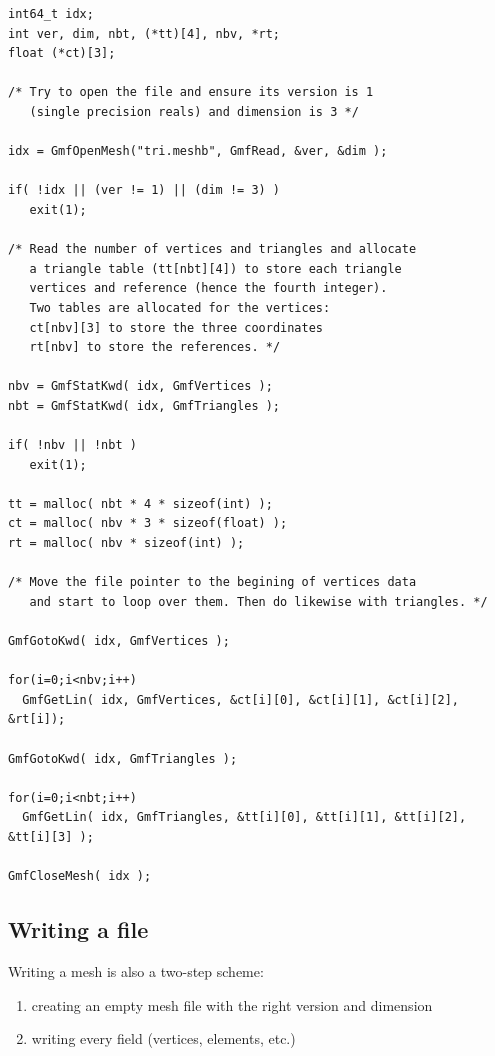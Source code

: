 \documentclass[a4paper,12pt]{article}
\begin{document}
\begin{tt}
\begin{verbatim}
int64_t idx;
int ver, dim, nbt, (*tt)[4], nbv, *rt;
float (*ct)[3];

/* Try to open the file and ensure its version is 1
   (single precision reals) and dimension is 3 */

idx = GmfOpenMesh("tri.meshb", GmfRead, &ver, &dim );

if( !idx || (ver != 1) || (dim != 3) )
   exit(1);

/* Read the number of vertices and triangles and allocate
   a triangle table (tt[nbt][4]) to store each triangle
   vertices and reference (hence the fourth integer).
   Two tables are allocated for the vertices:
   ct[nbv][3] to store the three coordinates
   rt[nbv] to store the references. */

nbv = GmfStatKwd( idx, GmfVertices );
nbt = GmfStatKwd( idx, GmfTriangles );

if( !nbv || !nbt )
   exit(1);

tt = malloc( nbt * 4 * sizeof(int) );
ct = malloc( nbv * 3 * sizeof(float) );
rt = malloc( nbv * sizeof(int) );

/* Move the file pointer to the begining of vertices data
   and start to loop over them. Then do likewise with triangles. */

GmfGotoKwd( idx, GmfVertices );

for(i=0;i<nbv;i++)
  GmfGetLin( idx, GmfVertices, &ct[i][0], &ct[i][1], &ct[i][2], &rt[i]);

GmfGotoKwd( idx, GmfTriangles );

for(i=0;i<nbt;i++)
  GmfGetLin( idx, GmfTriangles, &tt[i][0], &tt[i][1], &tt[i][2], &tt[i][3] );

GmfCloseMesh( idx );
\end{verbatim}
\end{tt}
\normalfont


\subsection{Writing a file}

Writing a mesh is also a two-step scheme:

\begin{enumerate}
\item creating an empty mesh file with the right version and dimension
\item writing every field (vertices, elements, etc.)
\end{enumerate}
\end{document}
